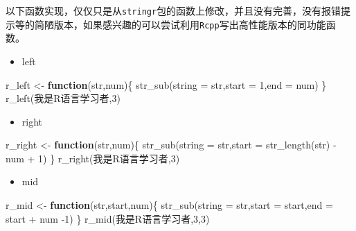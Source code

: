 \documentclass[
]{book}
\newenvironment{Shaded}{\begin{snugshade}}{\end{snugshade}}
\newcommand{\AttributeTok}[1]{\textcolor[rgb]{0.77,0.63,0.00}{#1}}
\newcommand{\ControlFlowTok}[1]{\textcolor[rgb]{0.13,0.29,0.53}{\textbf{#1}}}
\newcommand{\DecValTok}[1]{\textcolor[rgb]{0.00,0.00,0.81}{#1}}
\newcommand{\FunctionTok}[1]{\textcolor[rgb]{0.00,0.00,0.00}{#1}}
\newcommand{\NormalTok}[1]{#1}
\newcommand{\OtherTok}[1]{\textcolor[rgb]{0.56,0.35,0.01}{#1}}
\newcommand{\SpecialCharTok}[1]{\textcolor[rgb]{0.00,0.00,0.00}{#1}}
\newcommand{\StringTok}[1]{\textcolor[rgb]{0.31,0.60,0.02}{#1}}
\providecommand{\tightlist}{%
  \setlength{\itemsep}{0pt}\setlength{\parskip}{0pt}}
\begin{document}
以下函数实现，仅仅只是从\texttt{stringr}包的函数上修改，并且没有完善，没有报错提示等的简陋版本，如果感兴趣的可以尝试利用\texttt{Rcpp}写出高性能版本的同功能函数。

\begin{itemize}
\tightlist
\item
  left
\end{itemize}

\begin{Shaded}
\begin{Highlighting}[]
\NormalTok{r\_left }\OtherTok{\textless{}{-}} \ControlFlowTok{function}\NormalTok{(str,num)\{}
  \FunctionTok{str\_sub}\NormalTok{(}\AttributeTok{string =}\NormalTok{ str,}\AttributeTok{start =} \DecValTok{1}\NormalTok{,}\AttributeTok{end =}\NormalTok{ num)}
\NormalTok{\}}
\FunctionTok{r\_left}\NormalTok{(}\StringTok{\textquotesingle{}我是R语言学习者\textquotesingle{}}\NormalTok{,}\DecValTok{3}\NormalTok{)}
\end{Highlighting}
\end{Shaded}

\begin{itemize}
\tightlist
\item
  right
\end{itemize}

\begin{Shaded}
\begin{Highlighting}[]
\NormalTok{r\_right }\OtherTok{\textless{}{-}} \ControlFlowTok{function}\NormalTok{(str,num)\{}
  \FunctionTok{str\_sub}\NormalTok{(}\AttributeTok{string =}\NormalTok{ str,}\AttributeTok{start =} \FunctionTok{str\_length}\NormalTok{(str) }\SpecialCharTok{{-}}\NormalTok{ num }\SpecialCharTok{+} \DecValTok{1}\NormalTok{)}
\NormalTok{\}}
\FunctionTok{r\_right}\NormalTok{(}\StringTok{\textquotesingle{}我是R语言学习者\textquotesingle{}}\NormalTok{,}\DecValTok{3}\NormalTok{)}
\end{Highlighting}
\end{Shaded}

\begin{itemize}
\tightlist
\item
  mid
\end{itemize}

\begin{Shaded}
\begin{Highlighting}[]
\NormalTok{r\_mid }\OtherTok{\textless{}{-}} \ControlFlowTok{function}\NormalTok{(str,start,num)\{}
  \FunctionTok{str\_sub}\NormalTok{(}\AttributeTok{string =}\NormalTok{ str,}\AttributeTok{start =}\NormalTok{ start,}\AttributeTok{end =}\NormalTok{ start }\SpecialCharTok{+}\NormalTok{ num }\SpecialCharTok{{-}}\DecValTok{1}\NormalTok{)}
\NormalTok{\}}
\FunctionTok{r\_mid}\NormalTok{(}\StringTok{\textquotesingle{}我是R语言学习者\textquotesingle{}}\NormalTok{,}\DecValTok{3}\NormalTok{,}\DecValTok{3}\NormalTok{)}
\end{Highlighting}
\end{Shaded}
\end{document}
